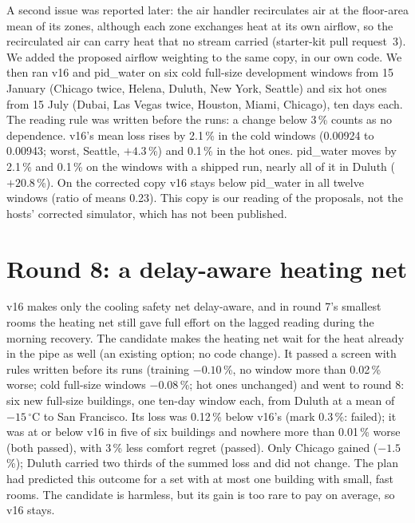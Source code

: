 \documentclass{article}
\begin{document}
A second issue was reported later: the air handler recirculates air at the floor-area mean of its zones, although each
zone exchanges heat at its own airflow, so the recirculated air can carry heat that no stream carried (starter-kit pull
request~3). We added the proposed airflow weighting to the same copy, in our own code. We then ran v16 and pid\_water
on six cold full-size development windows from 15 January (Chicago twice, Helena, Duluth, New York, Seattle) and six
hot ones from 15 July (Dubai, Las Vegas twice, Houston, Miami, Chicago), ten days each. The reading rule was written
before the runs: a change below 3\,\% counts as no dependence. v16's mean loss rises by 2.1\,\% in the cold windows (0.00924 to 0.00943; worst, Seattle,
$+4.3$\,\%) and 0.1\,\% in the hot ones. pid\_water moves by 2.1\,\% and 0.1\,\% on the windows with a shipped run, nearly
all of it in Duluth ($+20.8$\,\%). On the corrected copy v16 stays below pid\_water in all twelve windows (ratio of
means 0.23). This copy is our reading of the proposals, not the hosts' corrected simulator, which has not been published.

\section{Round 8: a delay-aware heating net}\label{app:r8}
v16 makes only the cooling safety net delay-aware, and in round 7's smallest rooms the heating net still gave full
effort on the lagged reading during the morning recovery. The candidate makes the heating net wait for the heat
already in the pipe as well (an existing option; no code change). It passed a screen with rules written before its
runs (training $-0.10$\,\%, no window more than 0.02\,\% worse; cold full-size windows $-0.08$\,\%; hot ones
unchanged) and went to round 8: six new full-size buildings, one ten-day window each, from Duluth at a mean of
$-15\,^\circ$C to San Francisco. Its loss was 0.12\,\% below v16's (mark 0.3\,\%: failed); it was at or below v16 in
five of six buildings and nowhere more than 0.01\,\% worse (both passed), with 3\,\% less comfort regret (passed).
Only Chicago gained ($-1.5$\,\%); Duluth carried two thirds of the summed loss and did not change. The plan had
predicted this outcome for a set with at most one building with small, fast rooms. The candidate is harmless, but its
gain is too rare to pay on average, so v16 stays.
\end{document}
